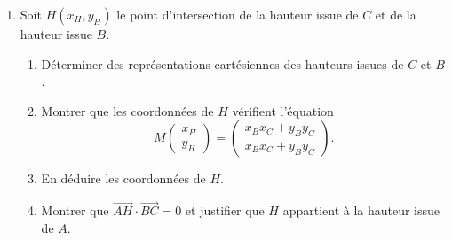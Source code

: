\documentclass[a4paper, 11pt,reqno]{article}
\begin{document}
\begin{exercice}
\begin{enumerate}
\item 
 Soit $H\left(x_H, y_H\right)$ le point d'intersection de la hauteur issue de $C$ et de la hauteur issue $B$.
 \begin{enumerate}
 \item  Déterminer des représentations cartésiennes des hauteurs issues de $C$ et $B$.
 \item  Montrer que les coordonnées de $H$ vérifient l'équation
$$
M\left(\begin{array}{l}
x_H \\
y_H
\end{array}\right)=\left(\begin{array}{c}
x_B x_C+y_B y_C \\
x_B x_C+y_B y_C
\end{array}\right) .
$$
 \item En déduire les coordonnées de $H$.
 \item Montrer que $\overrightarrow{A H} \cdot \overrightarrow{B C}=0$ et justifier que $H$ appartient à la hauteur issue de $A$.
 \end{enumerate}


\end{enumerate}
\end{exercice}
\end{document}
